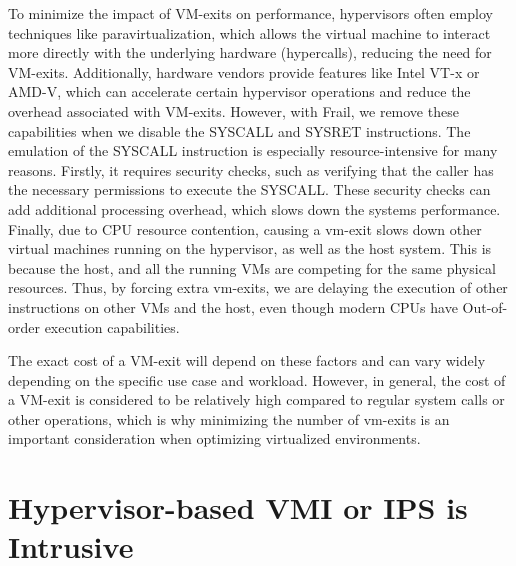 \documentclass{report}
\begin{document}
\begin{spacing}{1.5}
{To minimize the impact of VM-exits on performance, hypervisors often employ techniques like paravirtualization, which allows the virtual machine to interact more directly with the underlying hardware (hypercalls), reducing the need for VM-exits. Additionally, hardware vendors provide features like Intel VT-x or AMD-V, which can accelerate certain hypervisor operations and reduce the overhead associated with VM-exits. However, with Frail, we remove these capabilities when we disable the SYSCALL and SYSRET instructions. The emulation of the SYSCALL instruction is especially resource-intensive for many reasons. Firstly, it requires security checks, such as verifying that the caller has the necessary permissions to execute the SYSCALL. These security checks can add additional processing overhead, which slows down the systems performance. Finally, due to CPU resource contention, causing a vm-exit slows down other virtual machines running on the hypervisor, as well as the host system. This is because the host, and all the running VMs are competing for the same physical resources. Thus, by forcing extra vm-exits, we are delaying the execution of other instructions on other VMs and the host, even though modern CPUs have Out-of-order execution capabilities.
\newline
}

{\large
\noindent The exact cost of a VM-exit will depend on these factors and can vary widely depending on the specific use case and workload. However, in general, the cost of a VM-exit is considered to be relatively high compared to regular system calls or other operations, which is why minimizing the number of vm-exits is an important consideration when optimizing virtualized environments.
\newline 
}




\section{Hypervisor-based VMI or IPS is Intrusive}


\end{spacing}
\end{document}

